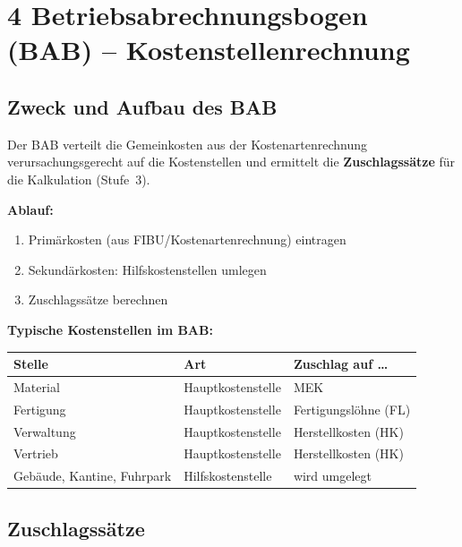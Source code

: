 \documentclass[10pt,a4paper]{article}
\begin{document}
\newpage

\section{4 \quad Betriebsabrechnungsbogen (BAB) -- Kostenstellenrechnung}

\begin{multicols}{2}

\subsection{Zweck und Aufbau des BAB}

Der BAB verteilt die Gemeinkosten aus der Kostenartenrechnung verursachungsgerecht auf die Kostenstellen und ermittelt die \textbf{Zuschlagssätze} für die Kalkulation (Stufe~3).

\textbf{Ablauf:}
\begin{enumerate}[noitemsep, leftmargin=*]
  \item Primärkosten (aus FIBU/Kostenartenrechnung) eintragen
  \item Sekundärkosten: Hilfskostenstellen umlegen
  \item Zuschlagssätze berechnen
\end{enumerate}

\vspace{4pt}
\textbf{Typische Kostenstellen im BAB:}

\begin{tabular}{|L{2cm}|L{2.5cm}|L{3cm}|}
\hline
{}
\textbf{Stelle} & \textbf{Art} & \textbf{Zuschlag auf \ldots} \\
\hline
Material & Hauptkostenstelle & MEK \\
Fertigung & Hauptkostenstelle & Fertigungslöhne (FL) \\
Verwaltung & Hauptkostenstelle & Herstellkosten (HK) \\
Vertrieb & Hauptkostenstelle & Herstellkosten (HK) \\
Gebäude, Kantine, Fuhrpark & Hilfskostenstelle & wird umgelegt \\
\hline
\end{tabular}

\subsection{Zuschlagssätze}


\end{multicols}
\end{document}
